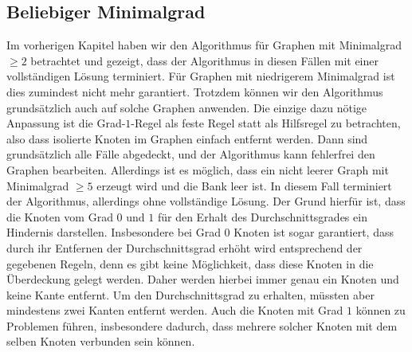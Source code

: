 \documentclass[12pt,onecolumn, notitlepage]{scrartcl}
\begin{document}
\subsection{Beliebiger Minimalgrad}
Im vorherigen Kapitel haben wir den Algorithmus für Graphen mit Minimalgrad $\geq 2$ betrachtet und gezeigt, dass der Algorithmus in diesen Fällen mit einer vollständigen Lösung terminiert. Für Graphen mit niedrigerem Minimalgrad ist dies zumindest nicht mehr garantiert. Trotzdem können wir den Algorithmus grundsätzlich auch auf solche Graphen anwenden. Die einzige dazu nötige Anpassung ist die Grad-$1$-Regel als feste Regel statt als Hilfsregel zu betrachten, also dass isolierte Knoten im Graphen einfach entfernt werden. Dann sind grundsätzlich alle Fälle abgedeckt, und der Algorithmus kann fehlerfrei den Graphen bearbeiten. Allerdings ist es möglich, dass ein nicht leerer Graph mit Minimalgrad $\geq 5$ erzeugt wird und die Bank leer ist. In diesem Fall terminiert der Algorithmus, allerdings ohne vollständige Lösung. \newline
Der Grund hierfür ist, dass die Knoten vom Grad $0$ und $1$ für den Erhalt des Durchschnittsgrades ein Hindernis darstellen. Insbesondere bei Grad $0$ Knoten ist sogar garantiert, dass durch ihr Entfernen der Durchschnittsgrad erhöht wird entsprechend der gegebenen Regeln, denn es gibt keine Möglichkeit, dass diese Knoten in die Überdeckung gelegt werden. Daher werden hierbei immer genau ein Knoten und keine Kante entfernt. Um den Durchschnittsgrad zu erhalten, müssten aber mindestens zwei Kanten entfernt werden. \newline
Auch die Knoten mit Grad $1$ können zu Problemen führen, insbesondere dadurch, dass mehrere solcher Knoten mit dem selben Knoten verbunden sein können. \newline
\end{document}

